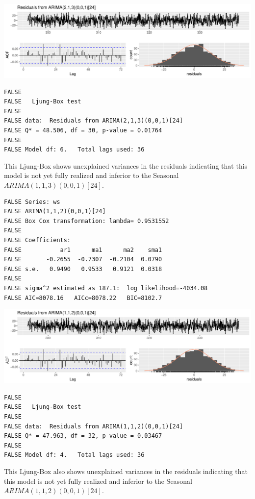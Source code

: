 \documentclass[openany]{book}
\begin{document}
\includegraphics{Group2_Project1_Fall2019_files/figure-latex/unnamed-chunk-26-1.pdf}

\begin{verbatim}
FALSE 
FALSE   Ljung-Box test
FALSE 
FALSE data:  Residuals from ARIMA(2,1,3)(0,0,1)[24]
FALSE Q* = 48.506, df = 30, p-value = 0.01764
FALSE 
FALSE Model df: 6.   Total lags used: 36
\end{verbatim}

This Ljung-Box shows unexplained variances in the residuals indicating
that this model is not yet fully realized and inferior to the Seasonal
\(ARIMA (1,1,3)(0,0,1)[24]\).

\begin{verbatim}
FALSE Series: ws 
FALSE ARIMA(1,1,2)(0,0,1)[24] 
FALSE Box Cox transformation: lambda= 0.9531552 
FALSE 
FALSE Coefficients:
FALSE           ar1      ma1      ma2    sma1
FALSE       -0.2655  -0.7307  -0.2104  0.0790
FALSE s.e.   0.9490   0.9533   0.9121  0.0318
FALSE 
FALSE sigma^2 estimated as 187.1:  log likelihood=-4034.08
FALSE AIC=8078.16   AICc=8078.22   BIC=8102.7
\end{verbatim}

\includegraphics{Group2_Project1_Fall2019_files/figure-latex/unnamed-chunk-27-1.pdf}

\begin{verbatim}
FALSE 
FALSE   Ljung-Box test
FALSE 
FALSE data:  Residuals from ARIMA(1,1,2)(0,0,1)[24]
FALSE Q* = 47.963, df = 32, p-value = 0.03467
FALSE 
FALSE Model df: 4.   Total lags used: 36
\end{verbatim}

This Ljung-Box also shows unexplained variances in the residuals
indicating that this model is not yet fully realized and inferior to the
Seasonal \(ARIMA (1,1,2)(0,0,1)[24]\).
\end{document}
